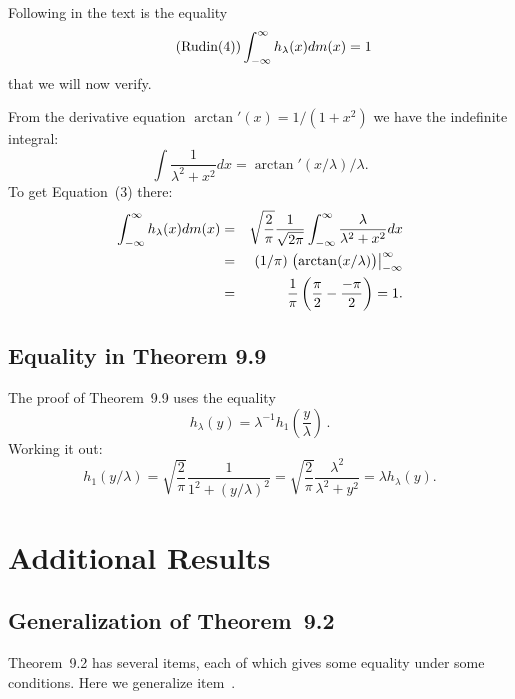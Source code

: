 Following in the text is the equality
\begin{equation} \tag{Rudin(4)}
\int_{-\infty}^{\infty} h_\lambda(x)dm(x) = 1
\end{equation}
that we will now verify.

From the derivative equation \(\arctan'(x) = 1/(1+x^2)\) we have
the indefinite integral:
\[\int \frac{1}{\lambda^2+x^2}dx = \arctan'(x/\lambda)/\lambda.\]
To get Equation~(3) there:
\begin{eqnarray*}
\int_{-\infty}^{\infty} h_\lambda(x)dm(x)
 & = & \sqrt{\frac{2}{\pi}}\frac{1}{\sqrt{2\pi}} \int_{-\infty}^{\infty} \frac{\lambda}{\lambda^2+x^2}dx \\
 & = & (1/\pi)
       \left.\bigl(\arctan(x/\lambda)\bigr)\right|_{-\infty}^{\infty} \\
 & = & \frac{1}{\pi}\left(\frac{\pi}{2} - \frac{-\pi}{2}\right) = 1.
\end{eqnarray*}

\subsection{Equality in Theorem 9.9}

The proof of Theorem~9.9 uses the equality
\begin{equation*}
h_\lambda(y) = \lambda^{-1}h_1\left(\frac{y}{\lambda}\right)\,.
\end{equation*}
Working it out:
\begin{equation*}
h_1(y/\lambda) 
= \sqrt{\frac{2}{\pi}}\frac{1}{1^2+(y/\lambda)^2}
= \sqrt{\frac{2}{\pi}}\frac{\lambda^2}{\lambda^2+y^2}
= \lambda h_\lambda(y).
\end{equation*}


\section{Additional Results}

\subsection{Generalization of Theorem~9.2} \label{sec:gen:thm9.2}

Theorem~9.2 has several items, each of which gives some equality
under some conditions. Here we generalize item~.

